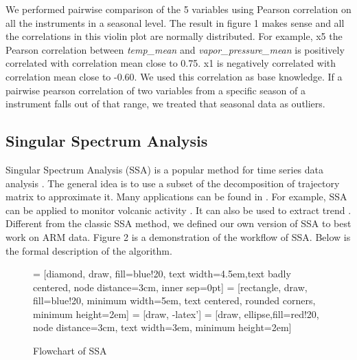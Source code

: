 \documentclass[letterpaper, 10 pt, conference]{ieeeconf}  %
\begin{document}
We performed pairwise comparison of the 5 variables using Pearson correlation on all the instruments in a seasonal level. The result in figure 1 makes sense and all the correlations in this violin plot are normally distributed. For example, x5 the Pearson correlation between \textit{temp\_mean} and \textit{vapor\_pressure\_mean} is positively correlated with correlation mean close to 0.75. x1 is negatively correlated with correlation mean close to -0.60. We used this correlation as base knowledge. If a pairwise pearson correlation of two variables from a specific season of a instrument falls out of that range, we treated that seasonal data as outliers.

\subsection{Singular Spectrum Analysis}
Singular Spectrum Analysis (SSA) is a popular method for time series data analysis \cite{golyandina2013singular, golyandina2014basic}. The general idea is to use a subset of the decomposition of trajectory matrix to approximate it. Many applications can be found in \cite{golyandina2013singular}. For example, SSA can be applied to monitor volcanic activity \cite{bozzo2010relationship}. It can also be used to extract trend \cite{alexandrov2008method}. Different from the classic SSA method, we defined our own version of SSA to best work on ARM data. Figure 2 is a demonstration of the workflow of SSA. Below is the formal description of the algorithm.

\begin{figure}[ht]
    \centering
     = [diamond, draw, fill=blue!20, text width=4.5em,text badly centered, node distance=3cm, inner sep=0pt]
     = [rectangle, draw, fill=blue!20, minimum width=5em, text centered, rounded corners, minimum height=2em]
     = [draw, -latex']
     = [draw, ellipse,fill=red!20, node distance=3cm, text width=3em, minimum height=2em]
    \caption{Flowchart of SSA}
    \label{fig:pcs}
\end{figure}
\end{document}

